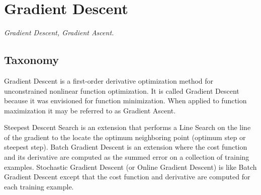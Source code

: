
\section{Gradient Descent} 
\label{sec:gradient_descent}

\emph{Gradient Descent, Gradient Ascent.}

\subsection{Taxonomy}
Gradient Descent is a first-order derivative optimization method for unconstrained nonlinear function optimization. It is called Gradient Descent because it was envisioned for function minimization. When applied to function maximization it may be referred to as Gradient Ascent. 

Steepest Descent Search is an extension that performs a Line Search on the line of the gradient to the locate the optimum neighboring point (optimum step or steepest step).
Batch Gradient Descent is an extension where the cost function and its derivative are computed as the summed error on a collection of training examples.
Stochastic Gradient Descent (or Online Gradient Descent) is like Batch Gradient Descent except that the cost function and derivative are computed for each training example.

